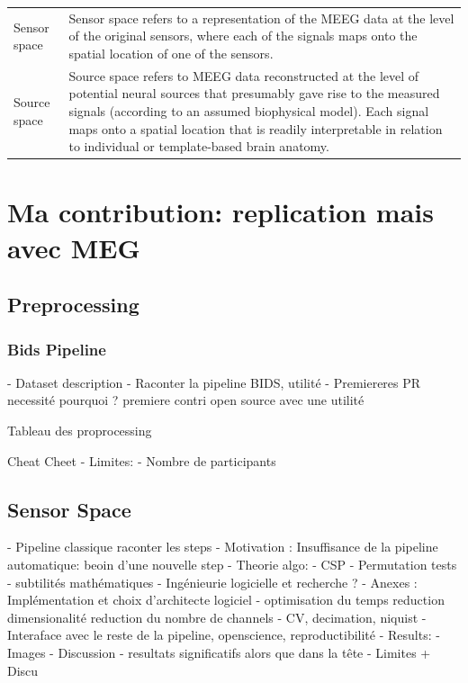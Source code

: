 \begin{table}[ht]
\begin{tabular}{@{}| p{3cm}|p{10cm}| @{}}
        Sensor space & Sensor space refers to a representation of the MEEG data at the level of the original sensors, where each of the signals maps onto the spatial location of one of the sensors.                                                                                                                                           \\
        Source space & Source space refers to MEEG data reconstructed at the level of potential neural sources that presumably gave rise to the measured signals (according to an assumed biophysical model). Each signal maps onto a spatial location that is readily interpretable in relation to individual or template-based brain anatomy. \\
        \hline
    \end{tabular}

    \label{Tab:Glossary_protocol}
\end{table}

\chapter{Ma contribution: replication mais avec MEG}



\section{Preprocessing}

\subsection{Bids Pipeline}
- Dataset description
- Raconter la pipeline BIDS, utilité
- Premiereres PR necessité pourquoi ?
premiere contri open source
avec une utilité


Tableau des proprocessing

Cheat Cheet
- Limites:
- Nombre de participants

\section{Sensor Space}

- Pipeline classique raconter les steps
- Motivation : Insuffisance de la pipeline automatique: beoin d'une nouvelle step
- Theorie algo:
- CSP
- Permutation tests
- subtilités mathématiques
- Ingénieurie logicielle et recherche ?
- Anexes : Implémentation et choix d'architecte logiciel
- optimisation du temps
reduction dimensionalité
reduction du nombre de channels
- CV, decimation, niquist
- Interaface avec le reste de la pipeline, openscience, reproductibilité
- Results:
- Images
- Discussion
- resultats significatifs alors que dans la tête
- Limites + Discu

